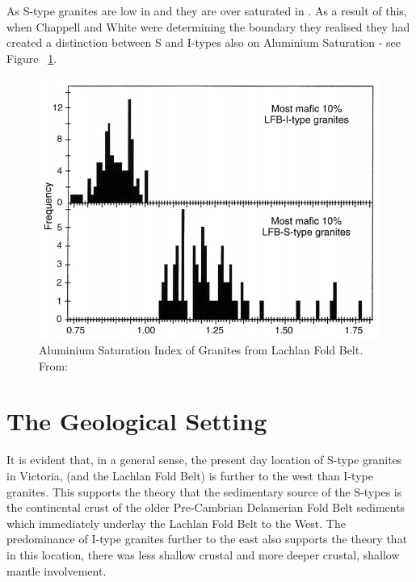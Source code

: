 \documentclass[a4paper]{article}
\begin{document}
As S-type granites are low in  and  they are over saturated in . As a result of this, when Chappell and White were determining the boundary they realised they had created a distinction between S and I-types also on Aluminium Saturation - see Figure  ~\ref{fig:AluminiumSaturationIndex}.

\begin{figure}[H]
\centering
\includegraphics[width=1\textwidth]{Aluminium_Saturation_Index.jpg}
\caption{\label{fig:AluminiumSaturationIndex}Aluminium Saturation Index of Granites from Lachlan Fold Belt. From: \cite{chappell1998high}}
\end{figure}

\section{The Geological Setting}

It is evident that, in a general sense, the present day location of S-type granites in Victoria, (and the Lachlan Fold Belt) is further to the west than I-type granites. This supports the theory that the sedimentary source of the S-types is the continental crust of the older Pre-Cambrian Delamerian Fold Belt sediments which immediately underlay the Lachlan Fold Belt to the West. The predominance of I-type granites further to the east also supports the theory that in this location, there was less shallow crustal and more deeper crustal, shallow mantle involvement.
\end{document}
